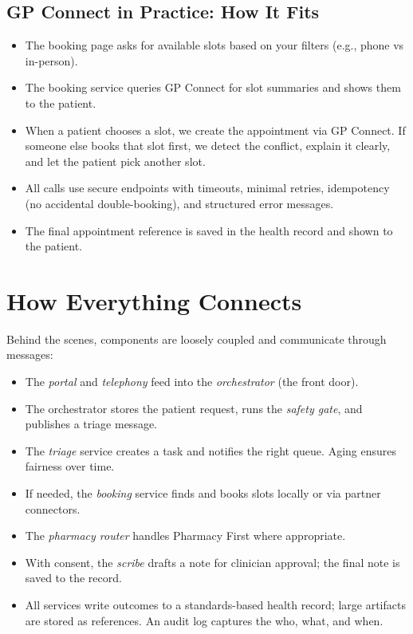 \documentclass[11pt]{article}
\begin{document}
\subsection*{GP Connect in Practice: How It Fits}
\begin{itemize}
  \item The booking page asks for available slots based on your filters (e.g., phone vs in-person).
  \item The booking service queries GP Connect for slot summaries and shows them to the patient.
  \item When a patient chooses a slot, we create the appointment via GP Connect. If someone else books that slot first, we detect the conflict, explain it clearly, and let the patient pick another slot.
  \item All calls use secure endpoints with timeouts, minimal retries, idempotency (no accidental double-booking), and structured error messages.
  \item The final appointment reference is saved in the health record and shown to the patient.
\end{itemize}

\section*{How Everything Connects}
Behind the scenes, components are loosely coupled and communicate through messages:
\begin{itemize}
  \item The \textit{portal} and \textit{telephony} feed into the \textit{orchestrator} (the front door).
  \item The orchestrator stores the patient request, runs the \textit{safety gate}, and publishes a triage message.
  \item The \textit{triage} service creates a task and notifies the right queue. Aging ensures fairness over time.
  \item If needed, the \textit{booking} service finds and books slots locally or via partner connectors.
  \item The \textit{pharmacy router} handles Pharmacy First where appropriate.
  \item With consent, the \textit{scribe} drafts a note for clinician approval; the final note is saved to the record.
  \item All services write outcomes to a standards-based health record; large artifacts are stored as references. An audit log captures the who, what, and when.
\end{itemize}
\end{document}
